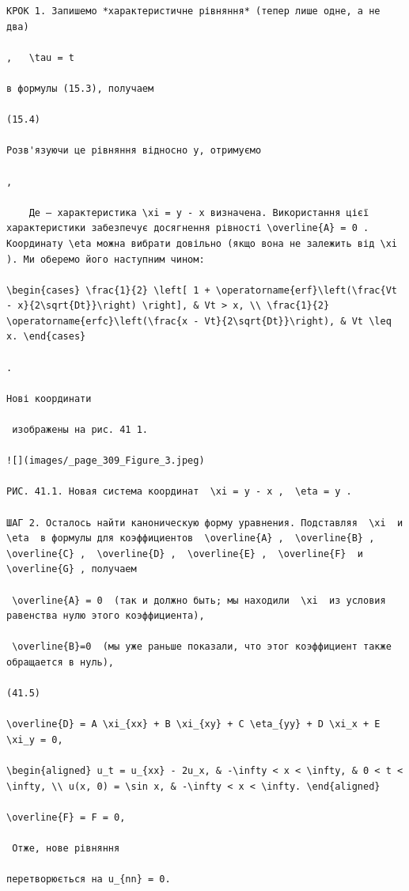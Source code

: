 \documentclass[
  ukrainian,
]{article}
\begin{document}
\begin{verbatim}
КРОК 1. Запишемо *характеристичне рівняння* (тепер лише одне, а не два)

,   \tau = t

в формулы (15.3), получаем

(15.4)

Розв'язуючи це рівняння відносно y, отримуємо

,

    Де — характеристика \xi = y - x визначена. Використання цієї характеристики забезпечує досягнення рівності \overline{A} = 0 . Координату \eta можна вибрати довільно (якщо вона не залежить від \xi ). Ми оберемо його наступним чином:

\begin{cases} \frac{1}{2} \left[ 1 + \operatorname{erf}\left(\frac{Vt - x}{2\sqrt{Dt}}\right) \right], & Vt > x, \\ \frac{1}{2} \operatorname{erfc}\left(\frac{x - Vt}{2\sqrt{Dt}}\right), & Vt \leq x. \end{cases}

.

Нові координати

 изображены на рис. 41 1.

![](images/_page_309_Figure_3.jpeg)

РИС. 41.1. Новая система координат  \xi = y - x ,  \eta = y .

ШАГ 2. Осталось найти каноническую форму уравнения. Подставляя  \xi  и  \eta  в формулы для коэффициентов  \overline{A} ,  \overline{B} ,  \overline{C} ,  \overline{D} ,  \overline{E} ,  \overline{F}  и  \overline{G} , получаем

 \overline{A} = 0  (так и должно быть; мы находили  \xi  из условия равенства нулю этого коэффициента),

 \overline{B}=0  (мы уже раньше показали, что этог коэффициент также обращается в нуль),

(41.5) 

\overline{D} = A \xi_{xx} + B \xi_{xy} + C \eta_{yy} + D \xi_x + E \xi_y = 0,

\begin{aligned} u_t = u_{xx} - 2u_x, & -\infty < x < \infty, & 0 < t < \infty, \\ u(x, 0) = \sin x, & -\infty < x < \infty. \end{aligned}

\overline{F} = F = 0,

 Отже, нове рівняння

перетворюється на u_{nn} = 0.


\end{verbatim}
\end{document}

